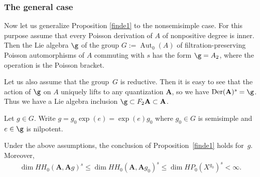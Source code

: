 \subsubsection{The general case}
Now let us generalize Proposition \ref{finde1} to the nonsemisimple case. For this purpose assume that every Poisson derivation of $A$ of nonpositive degree is inner. Then the Lie algebra $\g$ of the group
$G:=\operatorname{Aut}_0(A)$ of filtration-preserving Poisson automorphisms of $A$ commuting with $s$ has the form $\g=A_2$, where the operation is the Poisson bracket.

Let us also assume that the group~$G$ is reductive. Then it is easy to see that the action of $\g$ on $A$ uniquely lifts to any quantization ${\mathbf A}$, so we have ${\rm Der}({\mathbf A})^s=\g$. Thus we have a Lie algebra inclusion $\g\subset F_2{\mathbf A}\subset {\mathbf A}$.

Let $g\in G$. Write $g=g_0\exp(e)=\exp(e)g_0$ where $g_0\in G$ is semisimple and $e\in \g$ is nilpotent.

\begin{Proposition}\label{finde2} Under the above assumptions, the conclusion of Proposition~{\rm \ref{finde1}} holds for~$g$. Moreover,
\begin{gather*}
\dim HH_0({\mathbf A},{\mathbf A}g)^s\le \dim HH_0({\mathbf A},{\mathbf A}g_0)^s\le \dim HP_0(X^{g_0})^s<\infty.
\end{gather*}
\end{Proposition}

